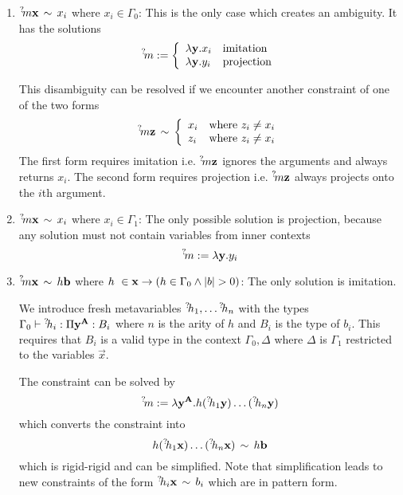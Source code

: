 \begin{enumerate}

    \item ${{}^? \kern-0.2em m} {\mathbf x} \,\sim\, x_i$ where $x_i \in \Gamma_0$: This is the
        only case which creates an ambiguity. It has the solutions
        $$
            {{}^? \kern-0.2em m} := \left\{ \begin{array}{lllll} 
                \lambda {\mathbf y}. x_i & \text{imitation}
                \\
                \lambda {\mathbf y}. y_i & \text{projection}
             \end{array} \right.
        $$

        This disambiguity can be resolved if we encounter another constraint of
        one of the two forms
        $$
            {{}^? \kern-0.2em m} {\mathbf z} \,\sim\,
            \left\{ \begin{array}{lllll} 
                x_i &\text{where } z_i \ne x_i
                \\
                z_i &\text{where } z_i \ne x_i
             \end{array} \right.
        $$
        The first form requires imitation i.e. ${{}^? \kern-0.2em m} {\mathbf z}$ ignores the
        arguments and always returns $x_i$. The second form requires projection
        i.e. ${{}^? \kern-0.2em m} {\mathbf z}$ always projects onto the $i$th argument.


    \item ${{}^? \kern-0.2em m} {\mathbf x} \,\sim\, x_i$ where $x_i \in \Gamma_1$: The only
        possible solution is projection, because any solution must not contain
        variables from inner contexts
        $$
            {{}^? \kern-0.2em m} := \lambda {\mathbf y} . y_i
        $$


    \item ${{}^? \kern-0.2em m} {\mathbf x} \,\sim\, h {\mathbf b}$ where $h \in \vec x \impl (h \in
        \Gamma_0 \land |b| > 0)$:
        The only solution is imitation.

        We introduce fresh metavariables ${{}^? \kern-0.2em h}_1, \ldots {{}^? \kern-0.2em h}_n$ with the
        types $\Gamma_0 \vdash {{}^? \kern-0.2em h}_i : \Pi {\mathbf y}^{{\mathbf A}} : B_i$ where $n$
        is the arity of $h$ and $B_i$ is the type of $b_i$. This requires that
        $B_i$ is a valid type in the context $\Gamma_0, \Delta$ where $\Delta$
        is $\Gamma_1$ restricted to the variables $\vec x$.

        The constraint can be solved by
        $$
            {{}^? \kern-0.2em m} :=
            \lambda {\mathbf y}^{{\mathbf A}} .
            h ({{}^? \kern-0.2em h}_1 {\mathbf y}) \ldots ({{}^? \kern-0.2em h}_n {\mathbf y})
        $$
        which converts the constraint into
        $$
            h ({{}^? \kern-0.2em h}_1 {\mathbf x}) \ldots ({{}^? \kern-0.2em h}_n {\mathbf x})
            \,\sim\,
            h {\mathbf b}
        $$
        which is rigid-rigid and can be simplified. Note that simplification
        leads to new constraints of the form ${{}^? \kern-0.2em h}_i {\mathbf x} \,\sim\, b_i$ which
        are in pattern form.


\end{enumerate}
